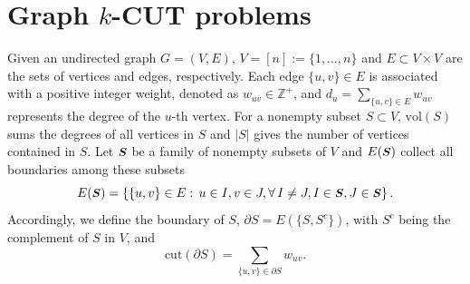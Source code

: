 \documentclass[12pt, a4paper]{article}%
\renewcommand{\vec}[1]{\mbox{\boldmath \small $#1$}}
\newcommand{\cut}{\mathrm{cut}}
\newcommand{\vol}{\mathrm{vol}}
\numberwithin{equation}{section}
\theoremstyle{plain}
\newcommand{\blue}{\textcolor{blue}}
\begin{document}
	
	
	
	
	
	
	\section{Graph $k$-CUT problems}
	\label{sec::notation}
	
	
	Given an undirected graph $G=(V,E)$, $V=[n] := \{1,\ldots,n\}$ and $E\subset V\times V$ are the sets of  vertices and edges, respectively. Each edge $\{u,v\}\in E$ is associated with a positive integer weight, denoted as $w_{uv}\in\mathbb{Z}^+$, and $d_u=\sum_{\{u,v\}\in E}w_{uv}$ represents the degree of the $u$-th vertex. For a nonempty subset $S\subset V$, $\vol(S)$ sums the degrees of all vertices in $S$
	and $|S|$ gives the number of vertices contained in $S$. Let $\vec S$ be a family of nonempty subsets of $V$ and $E(\vec S)$  collect all boundaries among these subsets
	\begin{equation}
		E(\vec S)=\left\{\{u,v\}\in E:\, u\in I, v\in J, \forall\, I\ne J, I\in\vec S, J\in\vec S\right\}.
	\end{equation}
	Accordingly, we define the boundary of $S$, $\partial S = E(\{S, S^c\})$, with $S^c$ being the complement of $S$ in $V$,
	and 
	\begin{equation}
		\cut(\partial S) = \sum_{\{u,v\}\in \partial S} w_{uv}.
	\end{equation}
	
	
	
\end{document}
